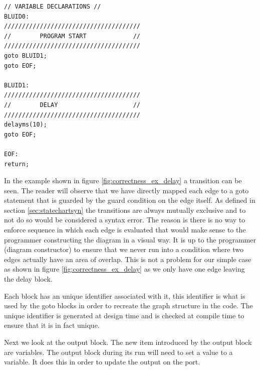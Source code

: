 \begin{minipage}{\textwidth}
\begin{lstlisting}[frame=single]
// VARIABLE DECLARATIONS //
BLUID0:
//////////////////////////////////////
//        PROGRAM START             //
//////////////////////////////////////
goto BLUID1;
goto EOF;

BLUID1:
//////////////////////////////////////
//        DELAY                     //
//////////////////////////////////////
delayms(10);
goto EOF;

EOF:
return;
\end{lstlisting}
\end{minipage}

In the example shown in figure \ref{fig:correctness_ex_delay} a transition can be seen. The reader will observe that we have directly mapped each edge to a goto statement that is guarded by the guard condition on the edge itself. As defined in section \ref{sec:statechartsyn} the transitions are always mutually exclusive and to not do so would be considered a syntax error. The reason is there is no way to enforce sequence in which each edge is evaluated that would make sense to the programmer constructing the diagram in a visual way. It is up to the programmer (diagram constructor) to ensure that we never run into a condition where two edges actually have an area of overlap. This is not a problem for our simple case as shown in figure \ref{fig:correctness_ex_delay} as we only have one edge leaving the delay block.

Each block has an unique identifier associated with it, this identifier is what is used by the goto blocks in order to recreate the graph structure in the code. The unique identifier is generated at design time and is checked at compile time to ensure that it is in fact unique.

Next we look at the output block. The new item introduced by the output block are variables. The output block during its run will need to set a value to a variable. It does this in order to update the output on the port. 

